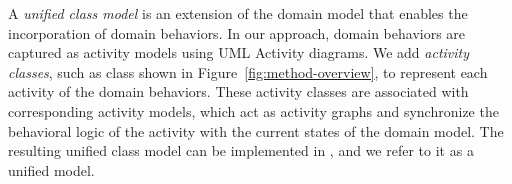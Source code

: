 A \textit{unified class model} is an extension of the domain model that enables the incorporation of domain behaviors. In our approach, domain behaviors are captured as activity models using UML Activity diagrams. We add \textit{activity classes}, such as class  shown in Figure~\ref{fig:method-overview}, to represent each activity of the domain behaviors. These activity classes are associated with corresponding activity models, which act as activity graphs and synchronize the behavioral logic of the activity with the current states of the domain model. The resulting unified class model can be implemented in \dcsl, and we refer to it as a \dcsl unified model.

